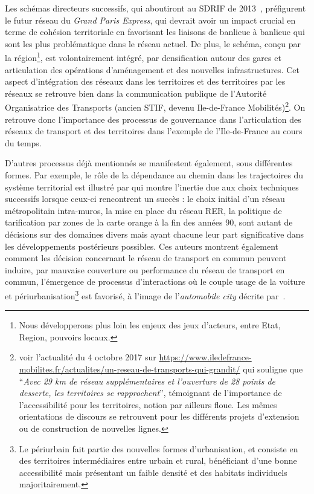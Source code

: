 Les schémas directeurs successifs, qui aboutiront au SDRIF de 2013~\cite{sdrif2013}, préfigurent le futur réseau du \emph{Grand Paris Express}, qui devrait avoir un impact crucial en terme de cohésion territoriale en favorisant les liaisons de banlieue à banlieue qui sont les plus problématique dans le réseau actuel. De plus, le schéma, conçu par la région\footnote{Nous développerons plus loin les enjeux des jeux d'acteurs, entre Etat, Region, pouvoirs locaux.}, est volontairement intégré, par densification autour des gares et articulation des opérations d'aménagement et des nouvelles infrastructures. Cet aspect d'intégration des réseaux dans les territoires et des territoires par les réseaux se retrouve bien dans la communication publique de l'Autorité Organisatrice des Transports (ancien STIF, devenu Ile-de-France Mobilités)\footnote{voir l'actualité du 4 octobre 2017 sur \url{https://www.iledefrance-mobilites.fr/actualites/un-reseau-de-transports-qui-grandit/} qui souligne que ``\textit{Avec 29 km de réseau supplémentaires et l’ouverture de 28 points de desserte, les territoires se rapprochent}'', témoignant de l'importance de l'accessibilité pour les territoires, notion par ailleurs floue. Les mêmes orientations de discours se retrouvent pour les différents projets d'extension ou de construction de nouvelles lignes.}. On retrouve donc l'importance des processus de gouvernance dans l'articulation des réseaux de transport et des territoires dans l'exemple de l'Ile-de-France au cours du temps.


D'autres processus déjà mentionnés se manifestent également, sous différentes formes. Par exemple, le rôle de la dépendance au chemin dans les trajectoires du système territorial est illustré par \cite{larroque2002paris} qui montre l'inertie due aux choix techniques successifs lorsque ceux-ci rencontrent un succès : le choix initial d'un réseau métropolitain intra-muros, la mise en place du réseau RER, la politique de tarification par zones de la carte orange à la fin des années 90, sont autant de décisions sur des domaines divers mais ayant chacune leur part significative dans les développements postérieurs possibles. Ces auteurs montrent également comment les décision concernant le réseau de transport en commun peuvent induire, par mauvaise couverture ou performance du réseau de transport en commun, l'émergence de processus d'interactions où le couple usage de la voiture et périurbanisation\footnote{Le périurbain fait partie des nouvelles formes d'urbanisation, et consiste en des territoires intermédiaires entre urbain et rural, bénéficiant d'une bonne accessibilité mais présentant un faible densité et des habitats individuels majoritairement.} est favorisé, à l'image de l'\emph{automobile city} décrite par~\cite{newman1996land}. 




